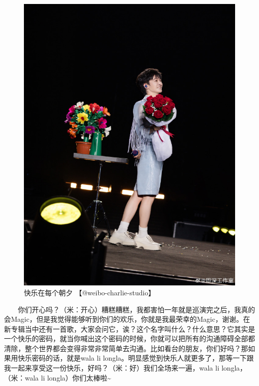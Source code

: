 \documentclass[]{ctexbook}
\begin{document}
\begin{figure}

{\centering \includegraphics[width=450pt]{img/nanjing20240811/001} 

}

\caption{快乐在每个朝夕 【@weibo-charlie-studio】}\label{fig:unnamed-chunk-76}
\end{figure}

  你们开心吗？（米：开心）糟糕糟糕，我都害怕一年就是巡演完之后，我真的会Magic，但是我觉得能够听到你们的欢乐，你就是我最荣幸的Magic，谢谢。在新专辑当中还有一首歌，大家会问它，诶？这个名字叫什么？什么意思？它其实是一个快乐的密码，就当你喊出这个密码的时候，你就可以把所有的沟通障碍全部都清除，整个世界都会变得非常非常简单去沟通。比如看台的朋友，你们好吗？那如果用快乐密码的话，就是wala li longla。明显感觉到快乐人就更多了，那等一下跟我一起来享受这一份快乐，好吗？（米：好）我们全场来一遍，wala li longla，（米：wala li longla）你们太棒啦\textasciitilde{}
\end{document}
